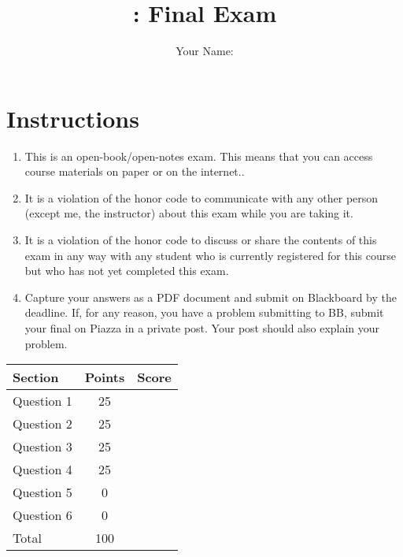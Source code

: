 \documentclass[10pt]{article}
\author{Your Name:}
\date{}
\title{\classname{}: Final Exam}
\begin{document}
\maketitle
\section*{Instructions}

\begin{enumerate}
\item This is an open-book/open-notes exam. This means that you can access course materials on paper or on the internet..

\item It is a violation of the honor code to communicate with any other person (except me, the instructor) about this exam while you are taking it.

\item It is a violation of the honor code to discuss or share the contents of this exam in any way with any student who is currently registered for this course but who has not yet completed this exam.


\item Capture your answers as a PDF document and submit on Blackboard by the deadline. If, for any reason, you have a problem submitting to BB,  submit your final on Piazza in a private post.  Your post should also explain your problem.

\end{enumerate}


\begin{center}
  \begin{tabular}{lcc}
    \toprule
    Section		&	Points	&	Score \\
    \midrule
    Question 1	&	 25	& \\
    Question 2	&	 25	& \\
    Question 3 	&	 25	& \\
    Question 4 	&	 25	& \\
    Question 5 	&	 0	& \\
    Question 6 	&	 0	& \\
    \midrule
    Total		&	100	& \\
    \bottomrule
  \end{tabular}
\end{center}
\end{document}
